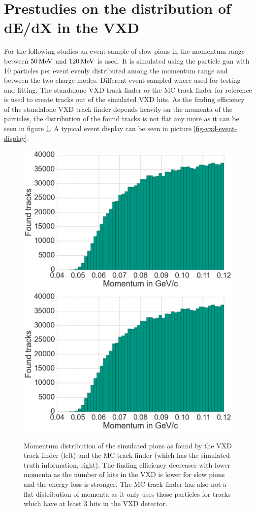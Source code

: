 \section{Prestudies on the distribution of dE/dX in the VXD}

For the following studies an event sample of slow pions in the momentum range between $\unit[50]{MeV}$ and $\unit[120]{MeV}$ is used. It is simulated using the particle gun with 10 particles per event evenly distributed among the momentum range and between the two charge modes. Different event sampled where used for testing and fitting. The standalone VXD track finder or the MC track finder for reference is used to create tracks out of the simulated VXD hits. As the finding efficiency of the standalone VXD track finder depends heavily on the momenta of the particles, the distribution of the found tracks is not flat any more as it can be seen in figure \ref{fig-vxd-finding-efficiency}. A typical event display can be seen in picture \ref{fig-vxd-event-display}.

\begin{figure}
 \centering
 \includegraphics[width=0.48\linewidth]{figures/vxd/finding_efficiency.png}
 \includegraphics[width=0.48\linewidth]{figures/vxd/finding_efficiency.png}
 \caption{Momentum distribution of the simulated pions as found by the VXD track finder (left) and the MC track finder (which has the simulated truth information, right). The finding efficiency decreases with lower momenta as the number of hits in the VXD is lower for slow pions and the energy loss is stronger. The MC track finder has also not a flat distribution of momenta as it only uses those particles for tracks which have at least 3 hits in the VXD detector.}
 \label{fig-vxd-finding-efficiency}
\end{figure}

